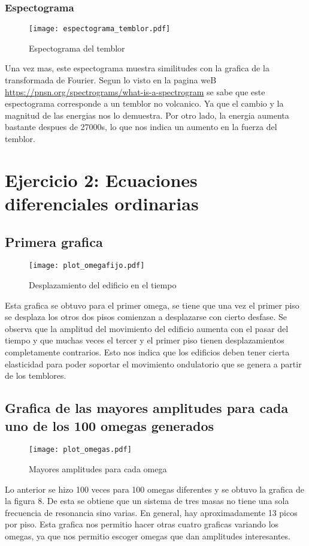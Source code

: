 \documentclass[11pt,letterpaper]{exam}
\begin{document}
\subsubsection{Espectograma}
\begin{figure}[H]
    \centering
    \texttt{[image: espectograma\_temblor.pdf]}
    \caption{Espectograma del temblor}
    \label{fig:my_label}
\end{figure}
Una vez mas, este espectograma muestra similitudes con la grafica de la transformada de Fourier. Segun lo visto en la pagina weB \url{https://pnsn.org/spectrograms/what-is-a-spectrogram} se sabe que este espectograma corresponde a un temblor no volcanico. Ya que el cambio y la magnitud de las energias nos lo demuestra. Por otro lado, la energia aumenta bastante despues de 27000s, lo que nos indica un aumento en la fuerza del temblor.
\section{Ejercicio 2: Ecuaciones diferenciales ordinarias}
\subsection{Primera grafica}
\begin{figure}[H]
    \centering
    \texttt{[image: plot\_omegafijo.pdf]}
    \caption{Desplazamiento del edificio en el tiempo}
    \label{fig:my_label}
\end{figure}
Esta grafica se obtuvo para el primer omega, se tiene que una vez el primer piso se desplaza los otros dos pisos comienzan a desplazarse con cierto desfase. Se observa que la amplitud del movimiento del edificio aumenta con el pasar del tiempo y que muchas veces el tercer y el primer piso tienen desplazamientos completamente contrarios. Esto nos indica que los edificios deben tener cierta elasticidad para poder soportar el movimiento ondulatorio que se genera a partir de los temblores. 
\subsection{Grafica de las mayores amplitudes para cada uno de los 100 omegas generados}
\begin{figure}[H]
    \centering
    \texttt{[image: plot\_omegas.pdf]}
    \caption{Mayores amplitudes para cada omega}
    \label{fig:my_label}
\end{figure}

Lo anterior se hizo 100 veces para 100 omegas diferentes y se obtuvo la grafica de la figura 8. De esta se obtiene que un sistema de tres masas no tiene una sola frecuencia de resonancia sino varias. En general, hay aproximadamente 13 picos por piso. Esta grafica nos permitio hacer otras cuatro graficas variando los omegas, ya que nos permitio escoger omegas que dan amplitudes interesantes. 
\end{document}
